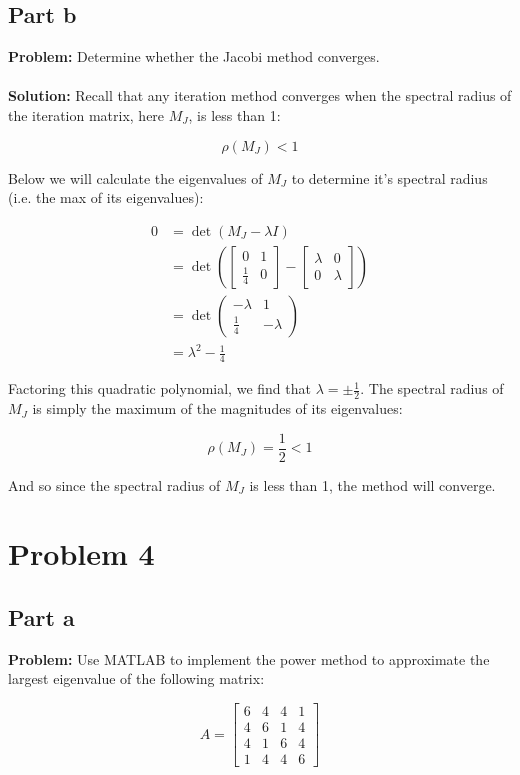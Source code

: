 \documentclass{article}
\begin{document}
\subsection*{Part b}
\textbf{Problem:} Determine whether the Jacobi method converges.
\\\\
\textbf{Solution:} Recall that any iteration method converges when the spectral radius of the iteration matrix, here $M_J$, is less than 1:

$$\rho(M_J)<1$$

Below we will calculate the eigenvalues of $M_J$ to determine it's spectral radius (i.e. the max of its eigenvalues):

$$\begin{align*}
0&=\det(M_J-\lambda I)\\
&=\det\left(\begin{bmatrix} 0 & 1 \\ \frac{1}{4} & 0 \end{bmatrix}-
\begin{bmatrix} \lambda & 0 \\ 0 & \lambda \end{bmatrix}\right)\\
&=\det\begin{pmatrix} -\lambda & 1 \\ \frac{1}{4} & -\lambda \end{pmatrix}\\
&=\lambda^2-\frac{1}{4}
\end{align*}$$

Factoring this quadratic polynomial, we find that $\lambda=\pm\frac{1}{2}$. The spectral radius of $M_J$ is simply the maximum of the magnitudes of its eigenvalues:

$$\rho(M_J)=\frac{1}{2}<1$$

And so since the spectral radius of $M_J$ is less than 1, the method will converge.

\section*{Problem 4}
\subsection*{Part a}
\textbf{Problem:} Use MATLAB to implement the power method to approximate the largest eigenvalue of the following matrix:

$$A=\begin{bmatrix}
6&4&4&1\\4&6&1&4\\4&1&6&4\\1&4&4&6
\end{bmatrix}$$
\end{document}
